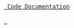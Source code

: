 \href{https://fehrobot.readthedocs.io/}{\texttt{ Code Documentation}}

\href{https://fehrobot.readthedocs.io/en/latest/?badge=latest}{\texttt{ }} 